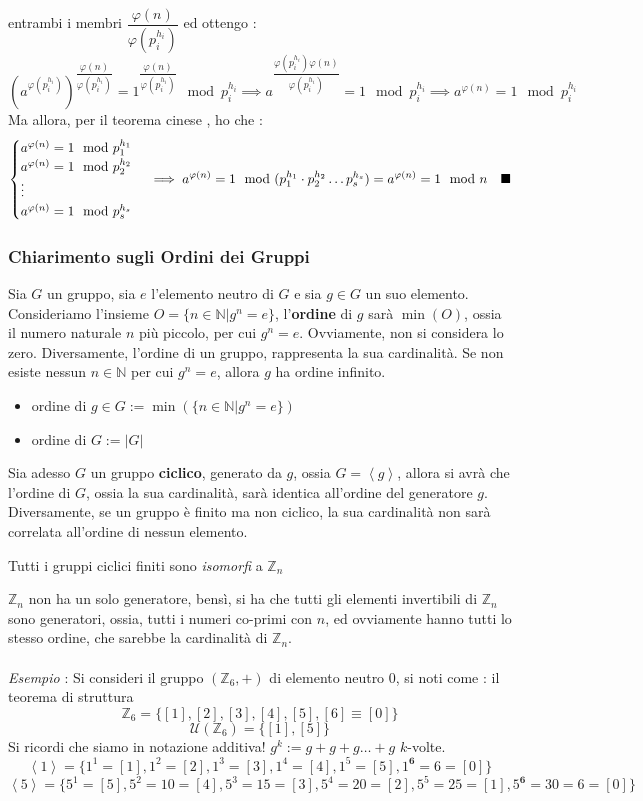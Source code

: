 \documentclass[12pt, letterpaper]{article}
\newcommand{\Z}{{\mathbb Z}}
\newcommand{\N}{{\mathbb N}}
\newcommand{\spaz}{{\text{\hphantom{aa}}}}
\newcommand{\acc}{\\\hphantom{}\\}
\begin{document}
entrambi i membri \(\dfrac{\varphi(n)}{\varphi(p_i^{h_i})}\) ed ottengo : 
$$(a^{\varphi(p_i^{h_i})})^{\dfrac{\varphi(n)}{\varphi(p_i^{h_i})}}=1^{\dfrac{\varphi(n)}{\varphi(p_i^{h_i})}}\mod p_i^{h_i}\implies
 a^{\dfrac{\varphi(p_i^{h_i})\varphi(n)}{\varphi(p_i^{h_i})}}=1 \mod p_i^{h_i}\implies a^{\varphi(n)}=1 \mod p_i^{h_i}$$
 Ma allora, per il teorema cinese , ho che : $$\begin{cases}
    a^{\varphi(n)}=1 \mod p_1^{h_1}\\
    a^{\varphi(n)}=1 \mod p_2^{h_2}\\\vdots \\ 
    a^{\varphi(n)}=1 \mod p_s^{h_s}
 \end{cases}\implies  a^{\varphi(n)}=1 \mod (p_1^{h_1}\cdot p_2^{h_2}\dots p_s^{h_s})=a^{\varphi(n)}=1 \mod n\spaz\blacksquare$$
\subsubsection{Chiarimento sugli Ordini dei Gruppi}
Sia \(G\) un gruppo, sia \(e\) l'elemento neutro di \(G\) e sia \(g\in G\) un suo elemento. Consideriamo l'insieme 
\(O=\{n\in\N|g^n=e\}\), l'\textbf{ordine} di \(g\) sarà \(\min(O)\), ossia il numero naturale \(n\) più piccolo, per 
cui \(g^n=e\). Ovviamente, non si considera lo zero. Diversamente, l'ordine di un gruppo, rappresenta la sua cardinalità. Se 
non esiste nessun \(n\in\N\) per cui \(g^n=e\), allora \(g\) ha ordine infinito.
\begin{itemize}
    \item ordine di \(g\in G:=\min(\{n\in\N|g^n=e\})\) 
    \item ordine di \(G := |G|\)
\end{itemize}
Sia adesso \(G\) un gruppo \textbf{ciclico}, generato da \(g\), ossia \(G=\left\langle g\right\rangle \), allora si avrà 
che l'ordine di \(G\), ossia la sua cardinalità, sarà identica all'ordine del generatore \(g\). Diversamente, se un gruppo 
è finito ma non ciclico, la sua cardinalità non sarà correlata all'ordine di nessun elemento.\begin{center}
    Tutti i gruppi ciclici finiti sono \textit{isomorfi} a \(\Z_n\)
\end{center}
\(\Z_n\) non ha un solo generatore, bensì, si ha che tutti gli elementi invertibili di \(\Z_n\) sono generatori, ossia, tutti 
i numeri co-primi con \(n\), ed ovviamente hanno tutti lo stesso ordine, che sarebbe la cardinalità di \(\Z_n\).\acc 
\textit{Esempio} : Si consideri il gruppo \((\Z_6,+)\) di elemento neutro \(0\), si noti come : 
il teorema di struttura$$\Z_6=\{[1],[2],[3],[4],[5],[6]\equiv [0]\}$$
$$\mathcal{U}(\Z_6)=\{[1],[5]\}$$
Si ricordi che siamo in notazione additiva! \(g^k:=g+g+g\dots +g \) \(k\)-volte.
$$\left\langle1\right\rangle=\{1^1=[1],1^2=[2],1^3=[3],1^4=[4],1^5=[5],1^\textbf{6}=6=[0]\} $$
$$\left\langle5\right\rangle=\{5^1=[5],5^2=10=[4],5^3=15=[3],5^4=20=[2],5^5=25=[1],5^\textbf{6}=30=6=[0]\}$$
\end{document}
